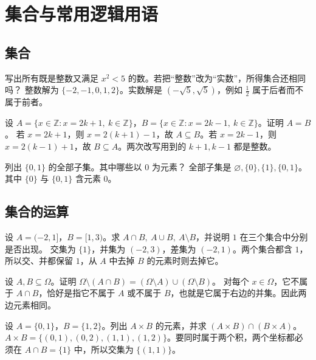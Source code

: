 \chapter{集合与常用逻辑用语}
\section{集合}

写出所有既是整数又满足 \(x^2<5\) 的数。若把“整数”改为“实数”，所得集合还相同吗？
\solutionanswer
整数解为 \(\{-2,-1,0,1,2\}\)。实数解是 \((-\sqrt5,\sqrt5)\)，例如 \(\tfrac12\) 属于后者而不属于前者。

设 \(A=\{x\in\mathbb Z:x=2k+1,\ k\in\mathbb Z\}\)，\(B=\{x\in\mathbb Z:x=2k-1,\ k\in\mathbb Z\}\)。证明 \(A=B\)。
\solutionanswer
若 \(x=2k+1\)，则 \(x=2(k+1)-1\)，故 \(A\subseteq B\)。若 \(x=2k-1\)，则 \(x=2(k-1)+1\)，故 \(B\subseteq A\)。两次改写用到的 \(k+1,k-1\) 都是整数。

列出 \(\{0,1\}\) 的全部子集。其中哪些以 \(0\) 为元素？
\solutionanswer
全部子集是 \(\varnothing,\{0\},\{1\},\{0,1\}\)。其中 \(\{0\}\) 与 \(\{0,1\}\) 含元素 \(0\)。

\section{集合的运算}

设 \(A=(-2,1]\)，\(B=[1,3)\)。求 \(A\cap B,\ A\cup B,\ A\setminus B\)，并说明 \(1\) 在三个集合中分别是否出现。
\solutionanswer
交集为 \(\{1\}\)，并集为 \((-2,3)\)，差集为 \((-2,1)\)。两个集合都含 \(1\)，所以交、并都保留 \(1\)，从 \(A\) 中去掉 \(B\) 的元素时则去掉它。

设 \(A,B\subseteq\Omega\)。证明 \(\Omega\setminus(A\cap B)=(\Omega\setminus A)\cup(\Omega\setminus B)\)。
\solutionanswer
对每个 \(x\in\Omega\)，它不属于 \(A\cap B\)，恰好是指它不属于 \(A\) 或不属于 \(B\)，也就是它属于右边的并集。因此两边元素相同。

设 \(A=\{0,1\}\)，\(B=\{1,2\}\)。列出 \(A\times B\) 的元素，并求 \((A\times B)\cap(B\times A)\)。
\solutionanswer
\(A\times B=\{(0,1),(0,2),(1,1),(1,2)\}\)。要同时属于两个积，两个坐标都必须在 \(A\cap B=\{1\}\) 中，所以交集为 \(\{(1,1)\}\)。

